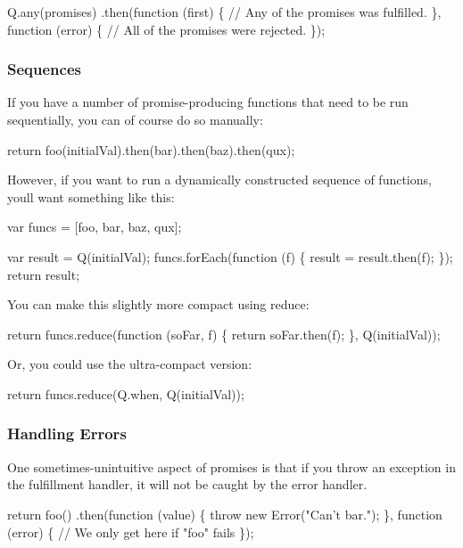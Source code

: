 \begin{DoxyCode}
Q.any(promises)
.then(function (first) \{
    // Any of the promises was fulfilled.
\}, function (error) \{
    // All of the promises were rejected.
\});
\end{DoxyCode}


\subsubsection*{Sequences}

If you have a number of promise-\/producing functions that need to be run sequentially, you can of course do so manually\+:


\begin{DoxyCode}
return foo(initialVal).then(bar).then(baz).then(qux);
\end{DoxyCode}


However, if you want to run a dynamically constructed sequence of functions, you\textquotesingle{}ll want something like this\+:


\begin{DoxyCode}
var funcs = [foo, bar, baz, qux];

var result = Q(initialVal);
funcs.forEach(function (f) \{
    result = result.then(f);
\});
return result;
\end{DoxyCode}


You can make this slightly more compact using {\ttfamily reduce}\+:


\begin{DoxyCode}
return funcs.reduce(function (soFar, f) \{
    return soFar.then(f);
\}, Q(initialVal));
\end{DoxyCode}


Or, you could use the ultra-\/compact version\+:


\begin{DoxyCode}
return funcs.reduce(Q.when, Q(initialVal));
\end{DoxyCode}


\subsubsection*{Handling Errors}

One sometimes-\/unintuitive aspect of promises is that if you throw an exception in the fulfillment handler, it will not be caught by the error handler.


\begin{DoxyCode}
return foo()
.then(function (value) \{
    throw new Error("Can't bar.");
\}, function (error) \{
    // We only get here if "foo" fails
\});
\end{DoxyCode}


